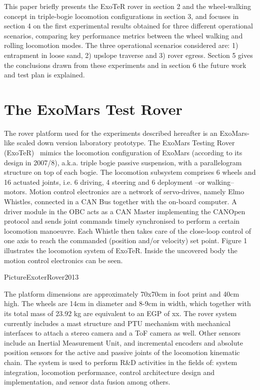 \documentclass[a4paper,twocolumn]{esapub2005} %
\begin{document}
This paper briefly presents the ExoTeR rover in section 2 and the wheel-walking concept in triple-bogie locomotion configurations in section 3, and focuses in section 4 on the first experimental results obtained for three different operational scenarios, comparing key performance metrics between the wheel walking and rolling locomotion modes. The three operational scenarios considered are: 1) entrapment in loose sand, 2) upslope traverse and 3) rover egress. Section 5 gives the conclusions drawn from these experiments and in section 6 the future work and test plan is explained.



\section{The ExoMars Test Rover}
The rover platform used for the experiments described hereafter is an ExoMars-like scaled down version laboratory prototype. The ExoMars Testing Rover (ExoTeR)~\cite{Azkarate2015} mimics the locomotion configuration of ExoMars (according to its design in 2007/8), a.k.a. triple bogie passive suspension, with a parallelogram structure on top of each bogie. The locomotion subsystem comprises 6 wheels and 16 actuated joints, i.e. 6 driving, 4 steering and 6 deployment –or walking– motors. 
Motion control electronics are a network of servo-drives, namely Elmo Whistles, connected in a CAN Bus together with the on-board computer. A driver module in the OBC acts as a CAN Master implementing the CANOpen protocol and sends joint commands timely synchronised to perform a certain locomotion manoeuvre. Each Whistle then takes care of the close-loop control of one axis to reach the commanded (position and/or velocity) set point. 
Figure 1 illustrates the locomotion system of ExoTeR. Inside the uncovered body the motion control electronics can be seen.

PictureExoterRover2013

The platform dimensions are approximately 70x70cm in foot print and 40cm high. The wheels are 14cm in diameter and 8-9cm in width, which together with its total mass of 23.92 kg are equivalent to an EGP of xx.
The rover system currently includes a mast structure and PTU mechanism with mechanical interfaces to attach a stereo camera and a ToF camera as well. Other sensors include an Inertial Measurement Unit, and incremental encoders and absolute position sensors for the active and passive joints of the locomotion kinematic chain.
The system is used to perform R\&D activities in the fields of: system integration, locomotion performance, control architecture design and implementation, and sensor data fusion among others. 
\end{document}
